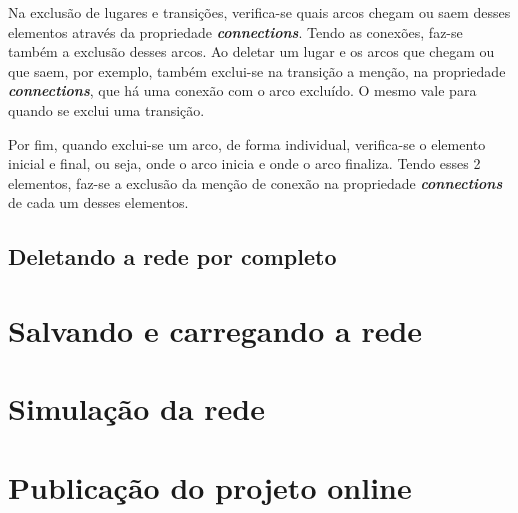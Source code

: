 \documentclass[
	12pt,				%
	openright,			%
	oneside,			%
	a4paper,			%
	english,			%
	brazil				%
	]{abntex2}
\begin{document}


Na exclusão de lugares e transições, verifica-se quais arcos chegam ou saem desses elementos através da propriedade \textbf{\textit{connections}}. Tendo as conexões, faz-se também a exclusão desses arcos. Ao deletar um lugar e os arcos que chegam ou que saem, por exemplo, também exclui-se na transição a menção, na propriedade \textbf{\textit{connections}}, que há uma conexão com o arco excluído. O mesmo vale para quando se exclui uma transição. 

Por fim, quando exclui-se um arco, de forma individual, verifica-se o elemento inicial e final, ou seja, onde o arco inicia e onde o arco finaliza. Tendo esses 2 elementos, faz-se a exclusão da menção de conexão na propriedade \textbf{\textit{connections}} de cada um desses elementos.

\subsection*{Deletando a rede por completo}

\section{Salvando e carregando a rede}

\section{Simulação da rede} \label{cap:simulation}

\section{Publicação do projeto online}


\end{document}
